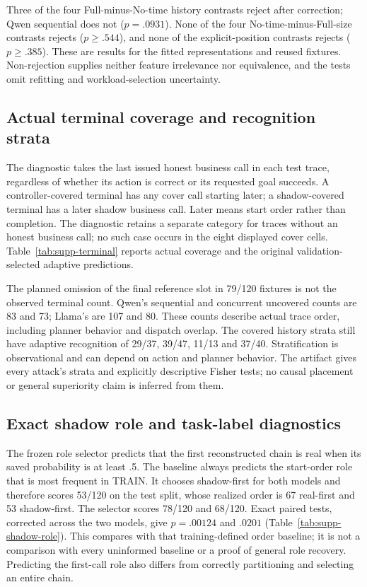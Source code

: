 Three of the four Full-minus-No-time history contrasts reject after correction; Qwen sequential does not ($p=.0931$). None of the four No-time-minus-Full-size contrasts rejects ($p\ge.544$), and none of the explicit-position contrasts rejects ($p\ge.385$). These are results for the fitted representations and reused fixtures. Non-rejection supplies neither feature irrelevance nor equivalence, and the tests omit refitting and workload-selection uncertainty.


\subsection{Actual terminal coverage and recognition strata}\label{supp:terminal}
The diagnostic takes the last issued honest business call in each test trace, regardless of whether its action is correct or its requested goal succeeds. A controller-covered terminal has any cover call starting later; a shadow-covered terminal has a later shadow business call. Later means start order rather than completion. The diagnostic retains a separate category for traces without an honest business call; no such case occurs in the eight displayed cover cells. Table~\ref{tab:supp-terminal} reports actual coverage and the original validation-selected adaptive predictions.

The planned omission of the final reference slot in 79/120 fixtures is not the observed terminal count. Qwen's sequential and concurrent uncovered counts are 83 and 73; Llama's are 107 and 80. These counts describe actual trace order, including planner behavior and dispatch overlap. The covered history strata still have adaptive recognition of 29/37, 39/47, 11/13 and 37/40. Stratification is observational and can depend on action and planner behavior. The artifact gives every attack's strata and explicitly descriptive Fisher tests; no causal placement or general superiority claim is inferred from them.


\subsection{Exact shadow role and task-label diagnostics}\label{supp:shadow-diagnostics}
The frozen role selector predicts that the first reconstructed chain is real when its saved probability is at least .5. The baseline always predicts the start-order role that is most frequent in TRAIN. It chooses shadow-first for both models and therefore scores 53/120 on the test split, whose realized order is 67 real-first and 53 shadow-first. The selector scores 78/120 and 68/120. Exact paired tests, corrected across the two models, give $p=.00124$ and $.0201$ (Table~\ref{tab:supp-shadow-role}). This compares with that training-defined order baseline; it is not a comparison with every uninformed baseline or a proof of general role recovery. Predicting the first-call role also differs from correctly partitioning and selecting an entire chain.

